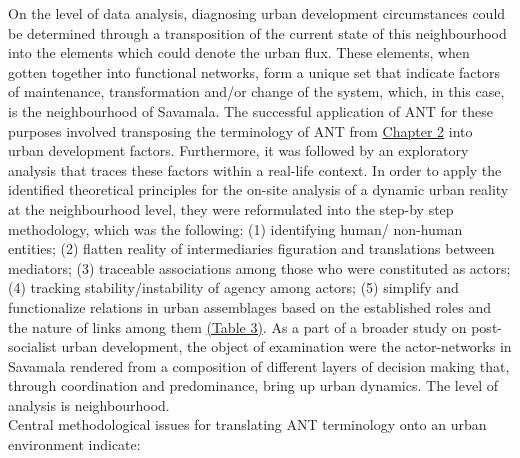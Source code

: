 \documentclass[11pt]{report}
\begin{document}
On the level of data analysis, diagnosing urban development circumstances could be determined through a transposition of the current state of this neighbourhood into the elements which could denote the urban flux. These elements, when gotten together into functional networks, form a unique set that indicate factors of maintenance, transformation and/or change of the system, which, in this case, is the neighbourhood of Savamala. The successful application of ANT for these purposes involved transposing the terminology of ANT from \href{ref}{Chapter 2} into urban development factors. Furthermore, it was followed by an exploratory analysis that traces these factors within a real-life context. In order to apply the identified theoretical principles for the on-site analysis of a dynamic urban reality at the neighbourhood level, they were reformulated into the step-by step methodology, which was the following: (1) identifying human/ non-human entities; (2) flatten reality of intermediaries figuration and translations between mediators; (3) traceable associations among those who were constituted as actors; (4) tracking stability/instability of agency among actors; (5) simplify and functionalize relations in urban assemblages based on the established roles and the nature of links among them \href{ref}{(Table 3)}. As a part of a broader study on post-socialist urban development, the object of examination were the actor-networks in Savamala rendered from a composition of different layers of decision making that, through coordination and predominance, bring up urban dynamics. The level of analysis is neighbourhood. 
\\
Central methodological issues for translating ANT terminology onto an urban environment indicate: 
\end{document}
